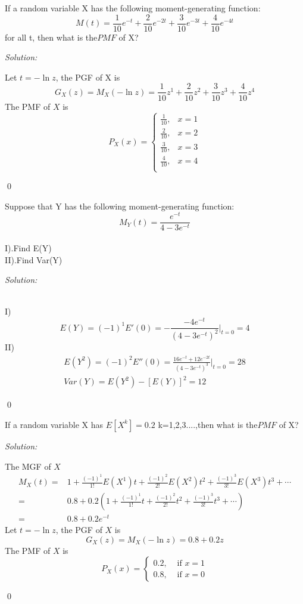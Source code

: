 \documentclass[12pt]{article}
\newenvironment{problem}[2][Problem]{\begin{trivlist}
\item[\hskip \labelsep {\bfseries #1}\hskip \labelsep {\bfseries #2.}]}{\end{trivlist}}
\newenvironment{sol}
    {\emph{Solution:}
    }
    {
    \qed
    }
\begin{document}
\begin{problem}{6}
If a random variable X has the following moment-generating function:
$$M(t) = \frac{1}{10}e^{-t} + \frac{2}{10}e^{-2t} + \frac{3}{10}e^{-3t} + \frac{4}{10}e^{-4t}$$
for all t, then what is the$ PMF$ of X?
\end{problem}
\begin{sol}
Let $t=-\ln z$, the PGF of X is
\[
G_X(z)=M_X(-\ln z)=\frac{1}{10}z^1+\frac{2}{10}z^2+\frac{3}{10}z^3+\frac{4}{10}z^4
\]
The PMF of $X$ is
\[
P_X(x)=\left\{\begin{array}{ll}
\frac{1}{10},&x=1\\
\frac{2}{10},&x=2\\
\frac{3}{10},&x=3\\
\frac{4}{10},&x=4\\
\end{array}\right.
\]
\end{sol}



\begin{problem}{7}
 Suppose that Y has the following moment-generating function:
 $$ M_{Y}(t) = \frac{e^{-t}}{4-3e^{-t}}$$
 \\
 I).Find E(Y)\\
 II).Find Var(Y)
\end{problem}
\begin{sol}
\\I)
\[
E(Y)=(-1)^1E'(0)=-\frac{-4e^{-t}}{(4-3e^{-t})^2}|_{t=0}=4
\]
II)
\begin{gather*}
E(Y^2)=(-1)^2E''(0)=\frac{16e^{-t}+12e^{-2t}}{(4-3e^{-t})^3}|_{t=0}=28\\
Var(Y)=E(Y^2)-[E(Y)]^2=12
\end{gather*}
\end{sol}



\begin{problem}{8}If a random variable X has  $E[X^k] = 0.2$ k=1,2,3....,then what is the$ PMF$ of X?
\end{problem}
\begin{sol}
The MGF of $X$
\begin{align*}
M_X(t)=&1+\frac{(-1)^1}{1!}E(X^1)t+\frac{(-1)^2}{2!}E(X^2)t^2+\frac{(-1)^3}{3!}E(X^3)t^3+\cdots\\
=&0.8+0.2(1+\frac{(-1)^1}{1!}t+\frac{(-1)^2}{2!}t^2+\frac{(-1)^3}{3!}t^3+\cdots)\\
=&0.8+0.2e^{-t}
\end{align*}
Let $t=-\ln z$, the PGF of $X$ is
\[
G_X(z)=M_X(-\ln z)=0.8+0.2z
\]
The PMF of $X$ is
\[
P_X(x)=\left\{\begin{array}{ll}0.2,&\text{ if }x=1\\0.8,&\text{ if }x=0\end{array}\right.
\]
\end{sol}

\end{document}
